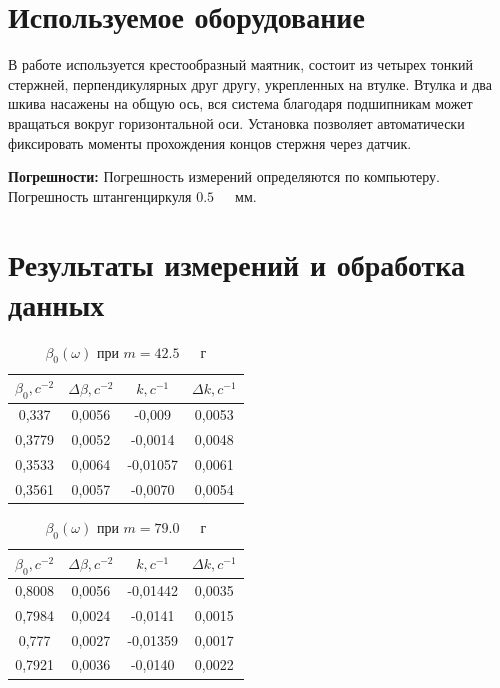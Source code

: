 \documentclass[a4paper,12pt]{article} %
\begin{document}
\section{Используемое оборудование}
В работе используется крестообразный маятник, состоит из четырех тонкий стержней, перпендикулярных друг другу, укрепленных на втулке. Втулка и два шкива насажены на общую ось, вся система благодаря подшипникам может вращаться вокруг горизонтальной оси. Установка позволяет автоматически фиксировать моменты прохождения концов стержня через датчик.

\textbf{Погрешности:}\newline
Погрешность измерений определяются по компьютеру. Погрешность штангенциркуля $ 0.5 $~~~мм.
\section{Результаты измерений и обработка данных}
\begin{table}[!ht]
    \centering
    \begin{tabular}{|c|c|c|c|}
    \hline
        $\beta_0, c^{-2}$ & $\Delta \beta, c^{-2}$ & $k, c^{-1}$ & $\Delta k, c^{-1}$ \\ \hline
        0,337 & 0,0056 & -0,009 & 0,0053 \\ \hline
        0,3779 & 0,0052 & -0,0014 & 0,0048 \\ \hline
        0,3533 & 0,0064 & -0,01057 & 0,0061 \\ \hline
        0,3561 & 0,0057 & -0,0070 & 0,0054  \\ \hline
    \end{tabular}
    \caption{$\beta_0(\omega)$ при $m=42.5$~~~г}
\end{table}
\begin{table}[!ht]
    \centering
    \begin{tabular}{|c|c|c|c|}
    \hline
        $\beta_0, c^{-2}$ & $\Delta \beta, c^{-2} $& $k, c^{-1}$ & $\Delta k, c^{-1}$ \\ \hline
        0,8008 & 0,0056 & -0,01442 & 0,0035  \\ \hline
        0,7984 & 0,0024 & -0,0141 & 0,0015  \\ \hline
        0,777 & 0,0027 & -0,01359 & 0,0017  \\ \hline
        0,7921 & 0,0036 & -0,0140 & 0,0022  \\ \hline
    \end{tabular}
    \caption{$\beta_0(\omega)$ при $m=79.0$~~~г}
\end{table}
\end{document}
